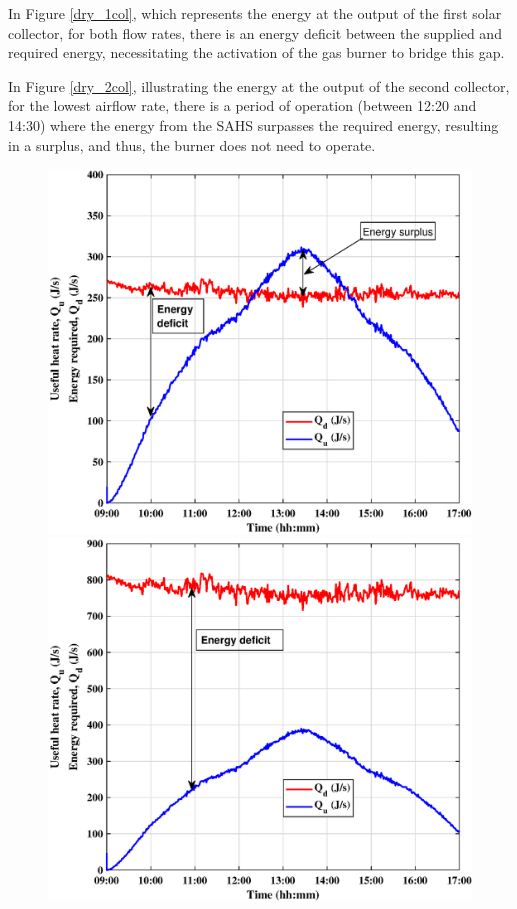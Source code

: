 In Figure \ref{dry_1col}, which represents the energy at the output of the first solar collector, for both flow rates, there is an energy deficit between the supplied and required energy, necessitating the activation of the gas burner to bridge this gap. 

In Figure \ref{dry_2col}, illustrating the energy at the output of the second collector, for the lowest airflow rate, there is a period of operation (between 12:20 and 14:30) where the energy from the SAHS surpasses the required energy, resulting in a surplus, and thus, the burner does not need to operate. 

\begin{figure}[ht!]
	\begin{minipage}{0.50\columnwidth}
		\includegraphics[scale=0.45]{figs/dry_low_2col.eps}
		
	\end{minipage}
	\begin{minipage}{0.50\columnwidth}
		\includegraphics[scale=0.45]{figs/dry_high_2col.eps}
		

\end{minipage}
\end{figure}
